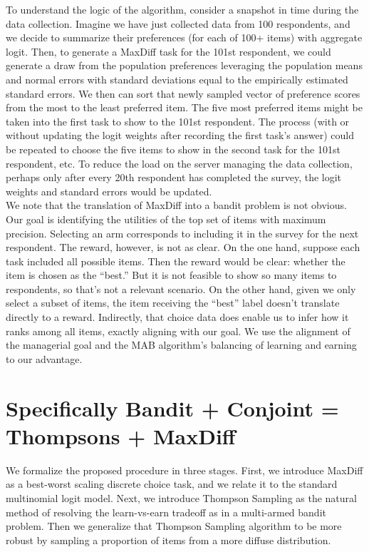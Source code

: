 \documentclass[nonblindrev]{informs3}
\begin{document}
To understand the logic of the algorithm, consider a snapshot in time during the data collection. Imagine we have just collected data from 100 respondents, and we decide to summarize their preferences (for each of 100+ items) with aggregate logit.  Then, to generate a MaxDiff task for the 101st respondent, we could generate a draw from the population preferences leveraging the population means and normal errors with standard deviations equal to the empirically estimated standard errors.  We then can sort that newly sampled vector of preference scores from the most to the least preferred item.  The five most preferred items might be taken into the first task to show to the 101st respondent.  The process (with or without updating the logit weights after recording the first task's answer) could be repeated to choose the five items to show in the second task for the 101st respondent, etc.  To reduce the load on the server managing the data collection, perhaps only after every 20th respondent has completed the survey, the logit weights and standard errors would be updated.\\
We note that the translation of MaxDiff into a bandit problem is not obvious. Our goal is identifying the utilities of the top set of items with maximum precision. Selecting an arm corresponds to including it in the survey for the next respondent. The reward, however, is not as clear. On the one hand, suppose each task included all possible items. Then the reward would be clear: whether the item is chosen as the ``best.'' But it is not feasible to show so many items to respondents, so that's not a relevant scenario. On the other hand, given we only select a subset of items, the item receiving the ``best'' label doesn't translate directly to a reward. Indirectly, that choice data does enable us to infer how it ranks among all items, exactly aligning with our goal. We use the alignment of the managerial goal and the MAB algorithm's balancing of learning and earning to our advantage.
\section{Specifically Bandit + Conjoint = Thompsons + MaxDiff}
We formalize the proposed procedure in three stages. First, we introduce MaxDiff as a best-worst scaling discrete choice task, and we relate it to the standard multinomial logit model. Next, we introduce Thompson Sampling as the natural method of resolving the learn-vs-earn tradeoff as in a multi-armed bandit problem.  Then we generalize that Thompson Sampling algorithm to be more robust by sampling a proportion of items from a more diffuse distribution.
\end{document}
